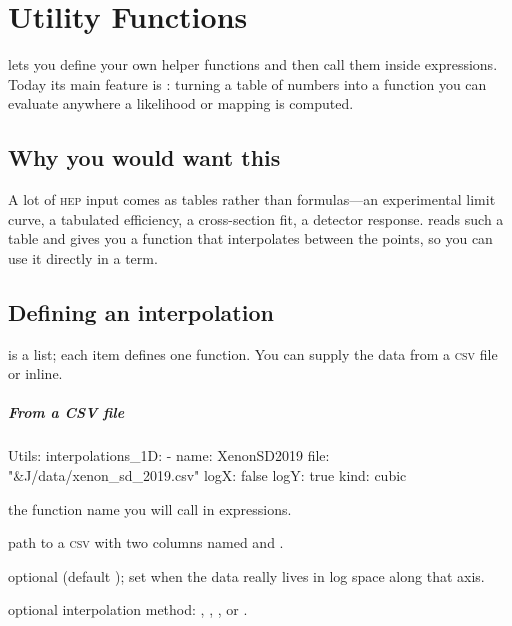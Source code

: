 \chapter{Utility Functions}
\label{ch:utils}

 lets you define your own helper functions and then call
them inside expressions. Today its main feature is : turning a table
of numbers into a function you can evaluate anywhere a likelihood or mapping is computed.

\section{Why you would want this}
\label{sec:utils-why}

A lot of \textsc{hep} input comes as tables rather than formulas---an experimental limit curve, a
tabulated efficiency, a cross-section fit, a detector response. 
reads such a table and gives you a function  that interpolates between the points, so
you can use it directly in a  term.

\section{Defining an interpolation}
\label{sec:utils-shape}

 is a list; each item defines one function. You can supply the data
from a \textsc{csv} file or inline.

\paragraph{From a CSV file}

\begin{yamlwin}
Utils:
  interpolations_1D:
    - name: XenonSD2019
      file: "&J/data/xenon_sd_2019.csv"
      logX: false
      logY: true
      kind: cubic
\end{yamlwin}

\begin{description}[style=nextline, leftmargin=1.2em]
  \item[\yamlkey{name}] the function name you will call in expressions.
  \item[\yamlkey{file}] path to a \textsc{csv} with two columns named  and .
  \item[\yamlkey{logX}, \yamlkey{logY}] optional (default ); set  when the
        data really lives in log space along that axis.
  \item[\yamlkey{kind}] optional interpolation method: , ,
        , or .
\end{description}

